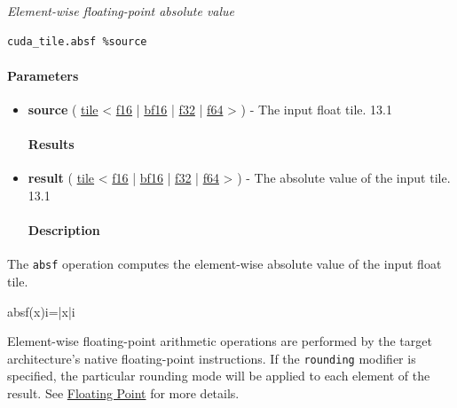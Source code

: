 \documentclass{article}
\begin{document}
\textit{Element-wise floating-point absolute value}


\begin{lstlisting}
cuda_tile.absf %source
\end{lstlisting}

\paragraph{Parameters}

\begin{itemize}
\item \textbf{source} ( \href{https://docs.nvidia.com/cuda/tile-ir/latest/sections/types.html#type-tile}{tile} < \href{https://docs.nvidia.com/cuda/tile-ir/latest/sections/types.html#subsection-element-types}{f16} | \href{https://docs.nvidia.com/cuda/tile-ir/latest/sections/types.html#subsection-element-types}{bf16} | \href{https://docs.nvidia.com/cuda/tile-ir/latest/sections/types.html#subsection-element-types}{f32} | \href{https://docs.nvidia.com/cuda/tile-ir/latest/sections/types.html#subsection-element-types}{f64} > ) - The input float tile. 13.1


\paragraph{Results}

\item \textbf{result} ( \href{https://docs.nvidia.com/cuda/tile-ir/latest/sections/types.html#type-tile}{tile} < \href{https://docs.nvidia.com/cuda/tile-ir/latest/sections/types.html#subsection-element-types}{f16} | \href{https://docs.nvidia.com/cuda/tile-ir/latest/sections/types.html#subsection-element-types}{bf16} | \href{https://docs.nvidia.com/cuda/tile-ir/latest/sections/types.html#subsection-element-types}{f32} | \href{https://docs.nvidia.com/cuda/tile-ir/latest/sections/types.html#subsection-element-types}{f64} > ) - The absolute value of the input tile. 13.1


\paragraph{Description}

\end{itemize}
The \texttt{absf} operation computes the element-wise absolute value of the input float tile.


absf(x)i=|x|i

Element-wise floating-point arithmetic operations are performed by the target architecture's native floating-point instructions. If the \texttt{rounding} modifier is specified, the particular rounding mode will be applied to each element of the result. See \href{https://docs.nvidia.com/cuda/tile-ir/latest/sections/operations.html#op-group-floating-point}{Floating Point} for more details.
\end{document}
